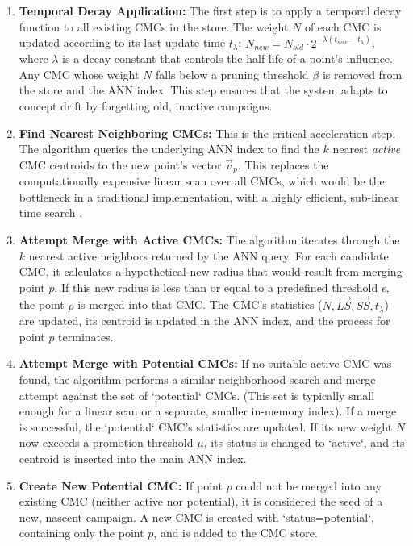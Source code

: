 \documentclass[journal,article,submit,pdftex,moreauthors]{Definitions/mdpi}
\begin{document}
\begin{enumerate}
    \item \textbf{Temporal Decay Application:} The first step is to apply a temporal decay function to all existing CMCs in the store. The weight $N$ of each CMC is updated according to its last update time $t_\lambda$: $N_{new} = N_{old} \cdot 2^{-\lambda(t_{now} - t_\lambda)}$, where $\lambda$ is a decay constant that controls the half-life of a point's influence. Any CMC whose weight $N$ falls below a pruning threshold $\beta$ is removed from the store and the ANN index. This step ensures that the system adapts to concept drift by forgetting old, inactive campaigns.
    \item \textbf{Find Nearest Neighboring CMCs:} This is the critical acceleration step. The algorithm queries the underlying ANN index to find the $k$ nearest \textit{active} CMC centroids to the new point's vector $\vec{v}_p$. This replaces the computationally expensive linear scan over all CMCs, which would be the bottleneck in a traditional implementation, with a highly efficient, sub-linear time search \cite{ref_subramanya}.
    \item \textbf{Attempt Merge with Active CMCs:} The algorithm iterates through the $k$ nearest active neighbors returned by the ANN query. For each candidate CMC, it calculates a hypothetical new radius that would result from merging point $p$. If this new radius is less than or equal to a predefined threshold $\epsilon$, the point $p$ is merged into that CMC. The CMC's statistics ($N, \vec{LS}, \vec{SS}, t_\lambda$) are updated, its centroid is updated in the ANN index, and the process for point $p$ terminates.
    \item \textbf{Attempt Merge with Potential CMCs:} If no suitable active CMC was found, the algorithm performs a similar neighborhood search and merge attempt against the set of `potential` CMCs. (This set is typically small enough for a linear scan or a separate, smaller in-memory index). If a merge is successful, the `potential` CMC's statistics are updated. If its new weight $N$ now exceeds a promotion threshold $\mu$, its status is changed to `active`, and its centroid is inserted into the main ANN index.
    \item \textbf{Create New Potential CMC:} If point $p$ could not be merged into any existing CMC (neither active nor potential), it is considered the seed of a new, nascent campaign. A new CMC is created with `status=potential`, containing only the point $p$, and is added to the CMC store.
\end{enumerate}
\end{document}
